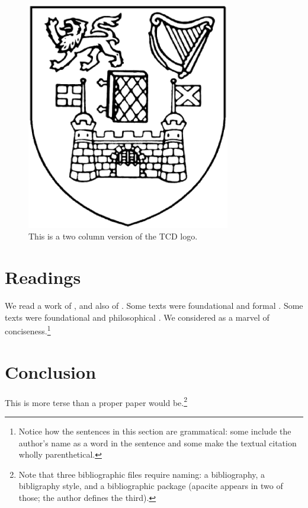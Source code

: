 \documentclass[10pt,twocolumn]{article}
\begin{document}
\begin{figure}[hbt]
  \begin{center}
    \includegraphics[width=3.5in]{figure.eps}
  \end{center}
  \caption{\small This is a two column version of the TCD logo.}
  \label{f:t}
\end{figure}

\section{Readings}

We read a work of , and also of
\citeauthor{Quine2d53}.  Some texts were foundational and formal
\cite{Gar79}.  Some texts were foundational and philosophical
\cite{Descartes1637}.  We considered  as a marvel of
conciseness.\footnote{Notice how the sentences in this section
are grammatical:  some include the author's name as a word in the
sentence and some make the textual citation wholly parenthetical.}

\section{Conclusion}

This is more terse than a proper paper would be.\footnote{Note that
three bibliographic files require naming: a bibliography, a bibligraphy
style, and a bibliographic package (apacite appears in two of those; 
the author defines the third).}



\end{document}

